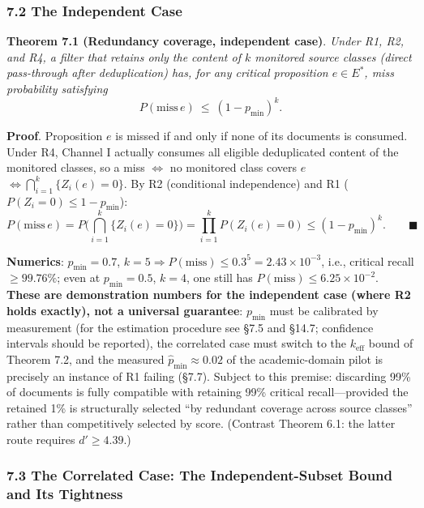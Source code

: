 \documentclass[
  11pt]{article}
\begin{document}
\subsubsection{7.2 The Independent Case}\label{the-independent-case}

\textbf{Theorem 7.1 (Redundancy coverage, independent case)}.
\emph{Under R1, R2, and R4, a filter that retains only the content of
\(k\) monitored source classes (direct pass-through after deduplication)
has, for any critical proposition \(e \in E^*\), miss probability
satisfying} \[P(\mathrm{miss}\, e) \ \le\ (1 - p_{\min})^k.\]

\textbf{Proof}. Proposition \(e\) is missed if and only if none of its
documents is consumed. Under R4, Channel I actually consumes all
eligible deduplicated content of the monitored classes, so a miss
\(\iff\) no monitored class covers \(e\)
\(\iff \bigcap_{i=1}^k \{Z_i(e) = 0\}\). By R2 (conditional
independence) and R1 (\(P(Z_i = 0) \le 1 - p_{\min}\)):
\[P(\mathrm{miss}\, e) = P\Big(\bigcap_{i=1}^k \{Z_i(e) = 0\}\Big) = \prod_{i=1}^k P(Z_i(e) = 0) \le (1 - p_{\min})^k. \qquad\blacksquare\]

\textbf{Numerics}: \(p_{\min} = 0.7\),
\(k = 5 \Rightarrow P(\mathrm{miss}) \le 0.3^5 = 2.43\times 10^{-3}\),
i.e., critical recall \(\ge 99.76\%\); even at \(p_{\min} = 0.5\),
\(k = 4\), one still has \(P(\mathrm{miss}) \le 6.25\times10^{-2}\).
\textbf{These are demonstration numbers for the independent case (where
R2 holds exactly), not a universal guarantee}: \(p_{\min}\) must be
calibrated by measurement (for the estimation procedure see §7.5 and
§14.7; confidence intervals should be reported), the correlated case
must switch to the \(k_{\mathrm{eff}}\) bound of Theorem 7.2, and the
measured \(\hat p_{\min} \approx 0.02\) of the academic-domain pilot is
precisely an instance of R1 failing (§7.7). Subject to this premise:
discarding 99\% of documents is fully compatible with retaining 99\%
critical recall---provided the retained 1\% is structurally selected
``by redundant coverage across source classes'' rather than
competitively selected by score. (Contrast Theorem 6.1: the latter route
requires \(d' \ge 4.39\).)

\subsubsection{7.3 The Correlated Case: The Independent-Subset Bound and
Its
Tightness}\label{the-correlated-case-the-independent-subset-bound-and-its-tightness}
\end{document}
